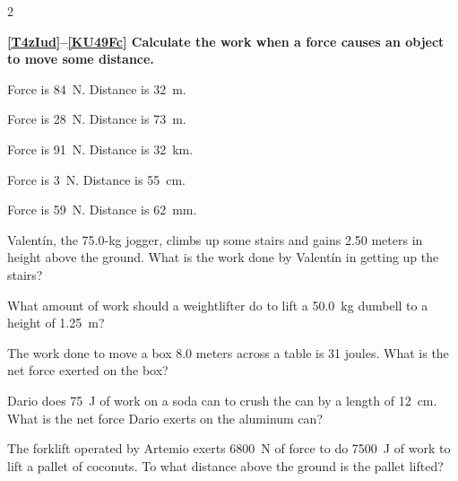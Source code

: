 \documentclass{article}
\numberwithin{equation}{section}
\numberwithin{figure}{section}
\begin{document}
\begin{multicols}{2}
\cyanhrule

\textbf{\ref{T4zIud}--\ref{KU49Fc} Calculate the work when a force causes an object to move some distance.}

\begin{exercise} \label{T4zIud}
    Force is \SI{84}{N}. Distance is \SI{32}{m}.
\end{exercise}

\begin{exercise} \label{mroTSQ}
    Force is \SI{28}{N}. Distance is \SI{73}{m}.
\end{exercise}

\begin{exercise} \label{1KDZL2}
    Force is \SI{91}{N}. Distance is \SI{32}{km}.
\end{exercise}

\begin{exercise} \label{masH3z}
    Force is \SI{3}{N}. Distance is \SI{55}{cm}.
\end{exercise}

\begin{exercise} \label{KU49Fc}
    Force is \SI{59}{N}. Distance is \SI{62}{mm}.
\end{exercise}

\cyanhrule

\begin{exercise} \label{VMEVDL}
    Valent\'{i}n, the 75.0-kg jogger, climbs up some stairs and gains 2.50 meters in height above the ground. What is the work done by Valent\'{i}n in getting up the stairs? 
\end{exercise}

\begin{exercise} \label{OgbvKL}
    What amount of work should a weightlifter do to lift a \SI{50.0}{kg} dumbell to a height of \SI{1.25}{m}?
\end{exercise}

\begin{exercise} \label{T8C3X0}
    The work done to move a box 8.0 meters across a table is 31 joules. What is the net force exerted on the box?
\end{exercise}

\begin{exercise} \label{7BKGsL}
    Dario does \SI{75}{J} of work on a soda can to crush the can by a length of \SI{12}{cm}. What is the net force Dario exerts on the aluminum can?
\end{exercise}

\begin{exercise} \label{sRogOc}
    The forklift operated by Artemio exerts \SI{6800}{N} of force to do \SI{7500}{J} of work to lift a pallet of coconuts. To what distance above the ground is the pallet lifted? 
\end{exercise}

\end{multicols}
\end{document}
